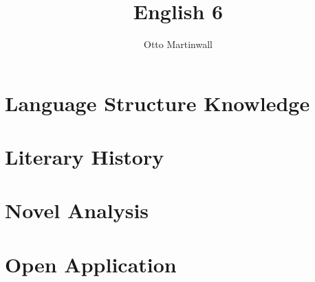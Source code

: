

\title{English 6}
\author{Otto Martinwall}


\maketitle
\tableofcontents
\newpage
{}

\section{Language Structure Knowledge}


\section{Literary History}


\section{Novel Analysis}


\section{Open Application}


